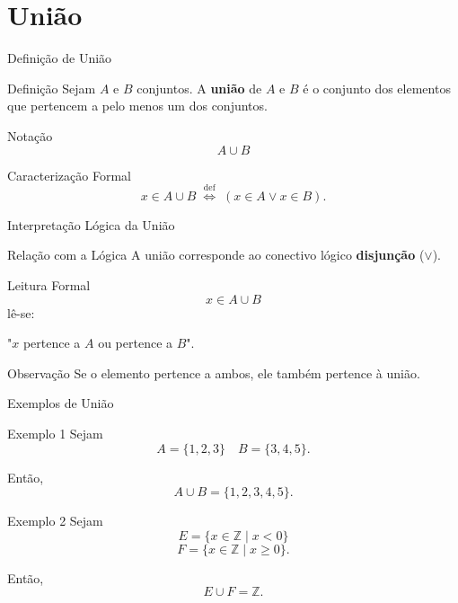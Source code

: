 \documentclass[9pt]{beamer}
\begin{document}
\section{União}

\begin{frame}{Definição de União}

\begin{block}{Definição}
Sejam $A$ e $B$ conjuntos.  
A \textbf{união} de $A$ e $B$ é o conjunto dos elementos
que pertencem a pelo menos um dos conjuntos.
\end{block}

\begin{block}{Notação}
\[
A \cup B
\]
\end{block}

\begin{block}{Caracterização Formal}
\[
x \in A \cup B
\;\stackrel{\text{def}}{\Longleftrightarrow}\;
(x \in A \lor x \in B).
\]
\end{block}

\end{frame}
\begin{frame}{Interpretação Lógica da União}

\begin{block}{Relação com a Lógica}
A união corresponde ao conectivo lógico
\textbf{disjunção} ($\lor$).
\end{block}

\begin{block}{Leitura Formal}
\[
x \in A \cup B
\]
lê-se:
\begin{center}
"$x$ pertence a $A$ ou pertence a $B$".
\end{center}
\end{block}

\begin{block}{Observação}
Se o elemento pertence a ambos,
ele também pertence à união.
\end{block}

\end{frame}
\begin{frame}{Exemplos de União}

\begin{block}{Exemplo 1}
Sejam
\[
A = \{1,2,3\}
\quad
B = \{3,4,5\}.
\]

Então,
\[
A \cup B = \{1,2,3,4,5\}.
\]
\end{block}

\begin{block}{Exemplo 2}
Sejam
\[
E = \{ x \in \mathbb{Z} \mid x < 0 \}
\]
\[
F = \{ x \in \mathbb{Z} \mid x \geq 0 \}.
\]

Então,
\[
E \cup F = \mathbb{Z}.
\]
\end{block}

\end{frame}
\end{document}
